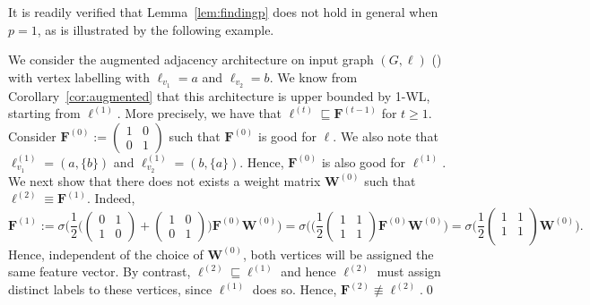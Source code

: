 
It is readily verified that Lemma~\ref{lem:findingp} does not hold in general when $p=1$, as
is illustrated by the following example.
\begin{example}
We consider the augmented adjacency architecture on input graph $(G,\pmb{\ell})$
() with 
vertex labelling with $\pmb{\ell}_{v_1}=a$ and $\pmb{\ell}_{v_2}=b$. We know from 
Corollary~\ref{cor:augmented} that this architecture is upper bounded by 1-WL, starting
from $\pmb{\ell}^{(1)}$. More precisely, we have that $\pmb{\ell}^{(t)}\sqsubseteq\mathbf{F}^{(t-1)}$ for $t\geq 1$.
Consider $\mathbf{F}^{(0)}:=\left(\begin{smallmatrix}1 & 0\\
0 & 1\end{smallmatrix}\right)$ such that $\mathbf{F}^{(0)}$ is good for $\pmb{\ell}$. We also note that $\pmb{\ell}^{(1)}_{v_1}=(a,\{b\})$ and $\pmb{\ell}^{(1)}_{v_2}=(b,\{a\})$. Hence, 
$\mathbf{F}^{(0)}$ is also good for $\pmb{\ell}^{(1)}$. We next show that there does not exists a
weight matrix $\mathbf{W}^{(0)}$ such that $\pmb{\ell}^{(2)}\equiv \mathbf{F}^{(1)}$. Indeed,
$$
\mathbf{F}^{(1)}:=\sigma\Biggl(\frac{1}{2}\biggl(\begin{pmatrix}0 & 1 \\
1 & 0
\end{pmatrix}+
\begin{pmatrix}
	 1 & 0 \\
0 & 1 \end{pmatrix}\biggl)\mathbf{F}^{(0)}\mathbf{W}^{(0)}\Biggr)
=\sigma(\Biggl(\frac{1}{2}\begin{pmatrix}1 & 1 \\
1 & 1
\end{pmatrix}
\mathbf{F}^{(0)}\mathbf{W}^{(0)}\Biggr)=
\sigma\Biggl(\frac{1}{2}\begin{pmatrix}
1& 1\\
1 & 1\\
\end{pmatrix}\mathbf{W}^{(0)}\Biggr).
$$
Hence, independent of the choice of $\mathbf{W}^{(0)}$, both vertices will be assigned the same
feature vector. By contrast, $\pmb{\ell}^{(2)}\sqsubseteq\pmb{\ell}^{(1)}$ and hence
$\pmb{\ell}^{(2)}$ must assign distinct labels to these vertices, since $\pmb{\ell}^{(1)}$ does so. Hence, $\mathbf{F}^{(2)}\not\equiv\pmb{\ell}^{(2)}$.\qed
\end{example}
